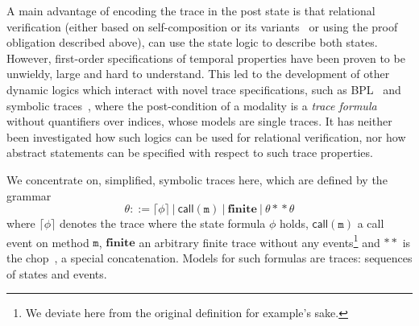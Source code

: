 A main advantage of encoding the trace in the post state is that relational verification (either based on self-composition or its variants~\cite{DBLP:conf/spc/DarvasHS05,DBLP:conf/csfw/BartheDR04,DBLP:conf/fm/BartheCK11} or using the proof obligation described above),
can use the state logic to describe both states.
However, first-order specifications of temporal properties have been proven to be unwieldy, large and hard to understand. 
This led to the development of other dynamic logics which interact with novel trace specifications, such as BPL~\cite{DBLP:conf/tableaux/Kamburjan19} and symbolic traces~\cite{DBLP:conf/tableaux/BubelDHN15}, where the post-condition of a modality is a \emph{trace formula} without quantifiers over indices, whose models are single traces.
It has neither been investigated how such logics can be used for relational verification, nor how abstract statements can be specified with respect to such trace properties.


We concentrate on, simplified, symbolic traces here, which are defined by the grammar
\[\theta ::= \lceil \phi \rceil ~|~ \mathsf{call}(\mathtt{m}) ~|~ \mathbf{finite} ~|~ \theta \ast\!\ast \theta \]
where $\lceil \phi \rceil$ denotes the trace where the state formula $\phi$ holds, $\mathsf{call}(\mathtt{m})$ a call event on method $\mathtt{m}$, $\mathbf{finite}$ an arbitrary finite trace without any events\footnote{We deviate here from the original definition for example's sake.} and $\ast\ast$ is the chop~\cite{DBLP:conf/tableaux/BubelDHN15}, a special concatenation.
Models for such formulas are traces: sequences of states and events.


